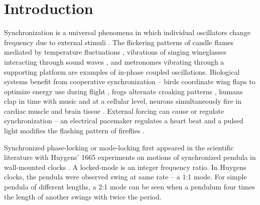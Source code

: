 \documentclass[twocolumn,preprintnumbers,amsmath,amssymb,aps,prx]{revtex4}
\begin{document}
\maketitle %

\section{Introduction} %
%
Synchronization is a universal phenomena
in which
individual oscillators change frequency due
to external stimuli \cite{Pikovsky2003}.
The
flickering patterns of
candle flames mediated by temperature fluctuations \cite{Okamoto2016},
vibrations of singing wineglasses interacting 
through sound waves \cite{Arane2009}, 
and metronomes vibrating through a supporting platform \cite{Jia2015}
are examples of in-phase coupled oscillations. %
Biological systems benefit from cooperative
synchronization -- %
birds coordinate wing flaps
to optimize energy use during flight \cite{Portugal2014},
frogs alternate croaking patterns \cite{Aihara2014},
humans clap in time with music \cite{Tranchant2016}
and 
at a cellular level, 
neurons simultaneously fire in cardiac muscle \cite{MartinHall1999}
and brain tissue \cite{Singer1999}.
External forcing can cause or regulate 
synchronization %
-- %
an electrical pacemaker %
regulates a heart beat 
and 
a pulsed light modifies the
flashing pattern of fireflies .%

Synchronized phase-locking or mode-locking 
first appeared in the scientific literature
with 
Huygens' 1665 experiments on
motions of synchronized 
pendula in wall-mounted clocks \cite{Bennett2002}.
A locked-mode is an integer frequency ratio.
In Huygens clocks,
the pendula were observed swing at same rate -- a 1:1 mode.
For simple pendula of different lengths,
a 2:1 mode can be seen when a pendulum four
times the length of another swings with twice the period.
%
\end{document}
